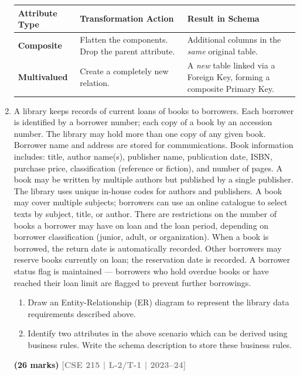 \documentclass[12pt,a3paper]{article}
\newcommand{\yr}[1]{\hfill\textcolor{gray}{\small\textbf{[#1]}}}
\newcommand{\mk}[1]{\textcolor{orange!70!black}{\small\textbf{(#1 marks)}}}
\begin{document}
\begin{enumerate}
\begin{tcolorbox}[enhanced,breakable,ansbox,colback=cA!4,colframe=cA,boxrule=0.8pt,arc=5pt,title={\textbf{Answer}},fonttitle=\bfseries\color{white},colbacktitle=cA]
\begin{center}
\begin{tabular}{@{} p{3.5cm} p{6cm} p{5.5cm} @{}}
\toprule
\textbf{Attribute Type} & \textbf{Transformation Action} & \textbf{Result in Schema} \\
\midrule
\textbf{Composite} & Flatten the components. Drop the parent attribute. & Additional columns in the \textit{same} original table. \\
\addlinespace
\textbf{Multivalued} & Create a completely new relation. & A \textit{new} table linked via a Foreign Key, forming a composite Primary Key. \\
\bottomrule
\end{tabular}
\end{center}

\end{tcolorbox}

\item A library keeps records of current loans of books to borrowers. Each borrower is identified by a borrower number; each copy of a book by an accession number. The library may hold more than one copy of any given book. Borrower name and address are stored for communications. Book information includes: title, author name(s), publisher name, publication date, ISBN, purchase price, classification (reference or fiction), and number of pages. A book may be written by multiple authors but published by a single publisher. The library uses unique in-house codes for authors and publishers. A book may cover multiple subjects; borrowers can use an online catalogue to select texts by subject, title, or author. There are restrictions on the number of books a borrower may have on loan and the loan period, depending on borrower classification (junior, adult, or organization). When a book is borrowed, the return date is automatically recorded. Other borrowers may reserve books currently on loan; the reservation date is recorded. A borrower status flag is maintained --- borrowers who hold overdue books or have reached their loan limit are flagged to prevent further borrowings.
\begin{enumerate}
  \item Draw an Entity-Relationship (ER) diagram to represent the library data requirements described above.
  \item Identify two attributes in the above scenario which can be derived using business rules. Write the schema description to store these business rules.
\end{enumerate}
\mk{26} \yr{CSE 215 | L-2/T-1 | 2023--24}


\end{enumerate}
\end{document}
